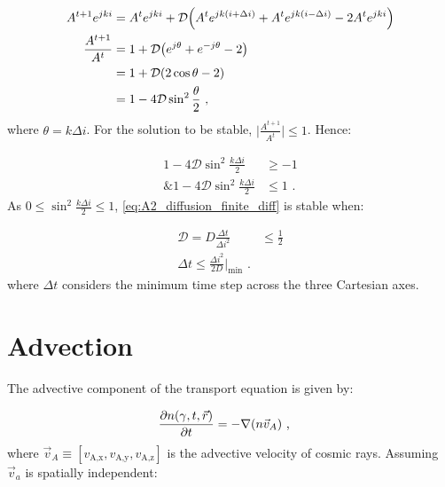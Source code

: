 \begin{equation}
    \begin{aligned}
    A^{t+1}e^{jki}&=A^te^{jki}+\mathcal{D}\qty(A^{t}e^{jk\qty(i+\Delta i)}+A^{t}e^{jk\qty(i-\Delta i)}-2A^te^{jki}) \\
    \frac{A^{t+1}}{A^t}&=1+\mathcal{D}\qty(e^{j\theta}+e^{-j\theta}-2) \\
    &=1+\mathcal{D}\qty(2\cos\theta-2) \\
    &=1-4\mathcal{D}\sin^2\frac{\theta}{2}\text{ ,} 
    \end{aligned}
\end{equation}
\noindent where $\theta= k\Delta i$. For the solution to be stable, $\lvert \frac{A^{t+1}}{A^t}\rvert\leq 1$. Hence:

\begin{equation}
    \begin{aligned}
    1-4\mathcal{D}\sin^2\frac{k\Delta i}{2} &\geq -1 \\
    \text{\& } 1-4\mathcal{D}\sin^2\frac{k\Delta i}{2} &\leq 1 \text{ .} 
    \end{aligned} \label{eq:A2_diffusion_finite_stability_cond}
\end{equation}
\noindent As $0\leq \sin^2\frac{k\Delta i}{2}\leq 1$, \autoref{eq:A2_diffusion_finite_diff} is stable when:

\begin{equation}
    \begin{aligned}
    \mathcal{D}=D\frac{\Delta t}{\Delta i^2}&\leq \frac{1}{2} \\
    \Delta t\leq \frac{\Delta i^2}{2D}\bigg|_\text{min}\text{ .} 
    \end{aligned}
\end{equation}
\noindent where $\Delta t$ considers the minimum time step across the three Cartesian axes.

\section{Advection}

The advective component of the transport equation is given by:

\begin{equation}
    \begin{aligned}
        \pdv{n\qty(\gamma,t,\vec{r})}{t}&=-\nabla\qty(n\vec{v}_A)\text{ ,} 
    \end{aligned}
\end{equation}
\noindent where $\vec{v}_A\equiv [v_\text{A,x},v_\text{A,y},v_\text{A,z}]$ is the advective velocity of cosmic rays. Assuming $\vec{v}_a$ is spatially independent:

